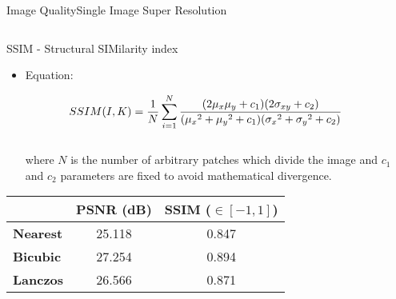 \documentclass[10pt, technote, oribibl, unicode]{beamer}
\begin{document}
\begin{frame}{Image Quality}{Single Image Super Resolution}
\begin{columns}
\begin{column}{0.65\textwidth}
\begin{alertblock}{SSIM - Structural SIMilarity index}
\begin{itemize}
          \item Equation:

          \begin{equation*}
          \hspace{-0.75cm}
          SSIM(I, K) = \frac{1}{N}\sum_{i=1}^{N} \frac{(2\mu_x\mu_y + c_1)(2\sigma_{xy} + c_2)}{ ({\mu_x}^2 + {\mu_y}^2 + c_1)({\sigma_x}^2 + {\sigma_y}^2 + c_2) }
          \end{equation*}
          \\
          where $N$ is the number of arbitrary patches which divide the image and $c_1$ and $c_2$ parameters are fixed to avoid mathematical divergence.

        \end{itemize}
      \end{alertblock}

      \begin{tabular}{lcc}
        \hline \rowcolor{DarkGreen!20!white}
                          & \textbf{PSNR (dB)} & \textbf{SSIM ($\in [-1, 1]$)} \\
        \hline
        \textbf{Nearest}  & 25.118             & 0.847                         \\
        \textbf{Bicubic}  & 27.254             & 0.894                         \\
        \textbf{Lanczos}  & 26.566             & 0.871                         \\
        \hline
      \end{tabular}
    \end{column}

  \end{columns}

\end{frame}
\end{document}
